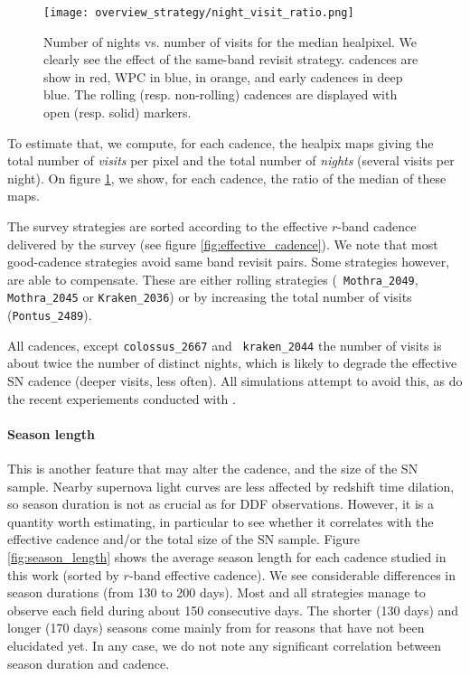 \begin{figure}
  \begin{center}
    \texttt{[image: overview\_strategy/night\_visit\_ratio.png]}
    \caption{Number of nights vs. number of visits for the median
      healpixel. We clearly see the effect of the same-band revisit
      strategy.  \altsched cadences are show in red, \opsim WPC in
      blue, \slair in orange, and early cadences in deep blue. The
      rolling (resp. non-rolling) cadences are displayed with open
      (resp. solid) markers. }
    \label{fig:effective_number_of_visits}
  \end{center}
\end{figure}

To estimate that, we compute, for each cadence, the healpix maps
giving the total number of {\em visits} per pixel and the total number
of {\em nights} (several visits per night).  On figure
\ref{fig:effective_number_of_visits}, we show, for each cadence, the
ratio of the median of these maps.  

The survey strategies are sorted according to the effective $r$-band
cadence delivered by the survey (see figure
\ref{fig:effective_cadence}).  We note that most good-cadence
strategies avoid same band revisit pairs. Some strategies however, are
able to compensate.  These are either rolling strategies ({\tt
  Mothra\_2049}, {\tt Mothra\_2045} or {\tt Kraken\_2036}) or by
increasing the total number of visits ({\tt Pontus\_2489}).

All \opsim cadences, except {\tt colossus\_2667} and {\tt
  kraken\_2044} the number of visits is about twice the number of
distinct nights, which is likely to degrade the effective SN cadence
(deeper visits, less often).  All \altsched simulations attempt to
avoid this, as do the recent experiements conducted with \slair.

\paragraph{Season length} This is another feature that may alter the cadence, and the size of the SN sample.
Nearby supernova light curves are less
affected by redshift time dilation, so season duration is not as
crucial as for DDF observations.  However, it is a quantity worth
estimating, in particular to see whether it correlates with the
effective cadence and/or the total size of the SN sample.
Figure \ref{fig:season_length} shows the average season length for
each cadence studied in this work (sorted by $r$-band effective
cadence).  We see considerable differences in season durations (from 130 to 200 days).
Most \opsim and all \altsched strategies manage to observe each field during about
150 consecutive days. The shorter (130 days) and longer (170 days) seasons come mainly from  \slair 
for reasons that have not been elucidated yet. In any case, we do not
note any significant correlation between season duration and cadence.

